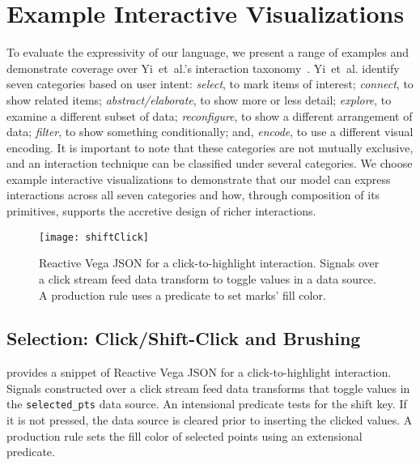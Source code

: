 \section{Example Interactive Visualizations}
\label{sec:vg:examples}

\vspace{-10pt}

To evaluate the expressivity of our language, we present a range of examples and
demonstrate coverage over Yi~et~al.'s interaction
taxonomy~\cite{yi:understanding}. Yi~et~al. identify seven categories based on
user intent: \emph{select}, to mark items of interest; \emph{connect}, to show
related items; \emph{abstract/elaborate}, to show more or less detail;
\emph{explore}, to examine a different subset of data; \emph{reconfigure}, to
show a different arrangement of data; \emph{filter}, to show something
conditionally; and, \emph{encode}, to use a different visual encoding. It is
important to note that these categories are not mutually exclusive, and an
interaction technique can be classified under several categories. We choose
example interactive visualizations to demonstrate that our model can express
interactions across all seven categories and how, through composition of its
primitives, supports the accretive design of richer interactions.

\begin{figure}[h!]
  \centering
  \texttt{[image: shiftClick]}
  \caption{Reactive Vega JSON for a click-to-highlight interaction. Signals over
  a click stream feed data transform to toggle values in a data source. A
  production rule uses a predicate to set marks' fill color.}
  \label{fig:vg:shiftClick}
\end{figure}

\subsection{Selection: Click/Shift-Click and Brushing}

\vspace{-7pt}

 provides a snippet of Reactive Vega JSON for a
click-to-highlight interaction. Signals constructed over a click stream feed
data transforms that toggle values in the \texttt{selected\_pts} data source. An
intensional predicate tests for the shift key. If it is not pressed, the data
source is cleared prior to inserting the clicked values. A production rule sets
the fill color of selected points using an extensional predicate.

